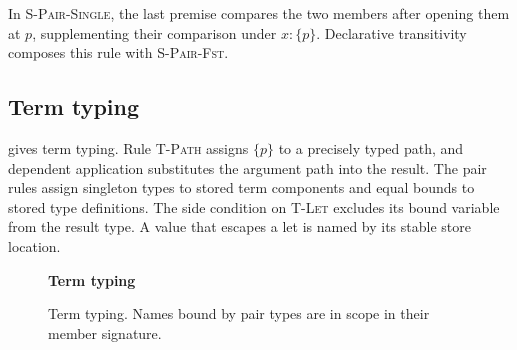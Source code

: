 \documentclass[acmsmall,screen,nonacm]{acmart}
\newcommand{\sing}[1]{\{#1\}}
\newcommand{\pairty}[4]{\langle #1\!:\!#2;\,#3\!:\!#4\rangle}
\newcommand{\pairval}[3]{\langle #1;\,#2=#3\rangle}
\newcommand{\subst}[3]{#1[#2/#3]}
\newcommand{\wf}{\mathrel{\mathsf{wf}}}
\newcommand{\judgheader}[3][]{%
  \par\addvspace{0.75em}%
  \noindent\textbf{#2}%
  \if\relax\detokenize{#1}\relax\else\quad #1\fi
  \hfill{\setlength{\fboxsep}{4pt}\setlength{\fboxrule}{0.5pt}%
    \fbox{\(\strut #3\)}}\par
  \nobreak\addvspace{0.85em}%
}
\begin{document}
In \textsc{S-Pair-Single}, the last premise compares the two members after
opening them at \(p\), supplementing their comparison under
\(x:\sing{p}\). Declarative transitivity composes this rule with
\textsc{S-Pair-Fst}.

\subsection{Term typing}

 gives term typing. Rule \textsc{T-Path} assigns \(\sing{p}\)
to a precisely typed path, and dependent application substitutes the argument
path into the result. The pair rules assign singleton types to stored term
components and equal bounds to stored type definitions.
The side condition on \textsc{T-Let} excludes its bound variable from the
result type. A value that escapes a let is named by its stable store location.

\begin{figure}[H]
\begin{minipage}{\textwidth}
\judgheader{Term typing}{\Gamma\vdash t:T}
\end{minipage}
\caption{Term typing. Names bound by pair types are in scope in their member
signature.}
\label{fig:typing}
\end{figure}
\end{document}
